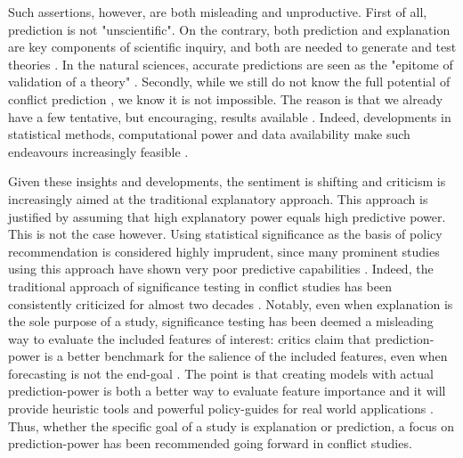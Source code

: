 \documentclass[a4paper]{article}
\begin{document}
Such assertions, however, are both misleading and unproductive. First of all, prediction is not "unscientific". On the contrary, both prediction and explanation are key components of scientific inquiry, and both are needed to generate and test theories \citep[8]{chadefaux2017conflict}. In the natural sciences, accurate predictions are seen as the "epitome of validation of a theory" \citep[289]{Schrodt_2014}. Secondly, while we still do not know the full potential of conflict prediction \citep{cederman2017predicting, chadefaux2017conflict}, we know it is not impossible. The reason is that we already have a few tentative, but encouraging, results available \citep{Goldstone_2010, perry_2013, mueller_2016, Maase}. Indeed, developments in statistical methods, computational power and data availability make such endeavours increasingly feasible \citep{ol2010afghanistan, perry_2013}. 

Given these insights and developments, the sentiment is shifting and criticism is increasingly aimed at the traditional explanatory approach. This approach is justified by assuming that high explanatory power equals high predictive power. This is not the case however. Using statistical significance as the basis of policy recommendation is considered highly imprudent, since many prominent studies using this approach have shown very poor predictive capabilities \citep{Ward_Greenhill_Bakke_2010, Schrodt_2014, chadefaux2017conflict}. Indeed, the traditional approach of significance testing in conflict studies has been consistently criticized for almost two decades \citep{king_zeng_2001b, Ward_Greenhill_Bakke_2010, Goldstone_2010, Schrodt_2014, chadefaux2017conflict}. Notably, even when explanation is the sole purpose of a study, significance testing has been deemed a misleading way to evaluate the included features of interest: critics claim that prediction-power is a better benchmark for the salience of the included features, even when forecasting is not the end-goal \citep{Ward_Greenhill_Bakke_2010, Schrodt_2014}. The point is that creating models with actual prediction-power is both a better way to evaluate feature importance and it will provide heuristic tools and powerful policy-guides for real world applications \citep[372]{Ward_Greenhill_Bakke_2010}. Thus, whether the specific goal of a study is explanation or prediction, a focus on prediction-power has been recommended going forward in conflict studies.\par
\end{document}
